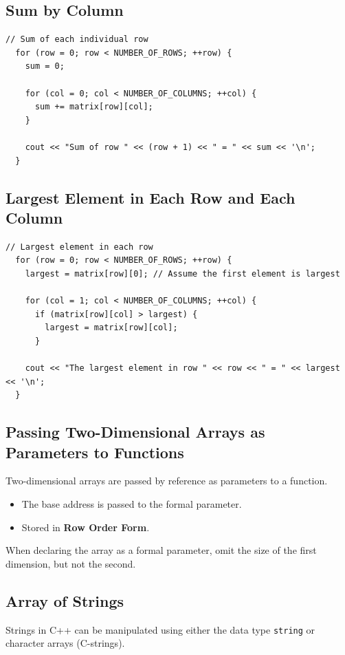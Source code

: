 \documentclass{article}
\begin{document}
\subsection{Sum by Column}
\begin{lstlisting}[caption={Find Sum of Individual Columns}]
  // Sum of each individual row 
  for (row = 0; row < NUMBER_OF_ROWS; ++row) {
    sum = 0;

    for (col = 0; col < NUMBER_OF_COLUMNS; ++col) {
      sum += matrix[row][col];
    }

    cout << "Sum of row " << (row + 1) << " = " << sum << '\n';
  }
\end{lstlisting}

\subsection{Largest Element in Each Row and Each Column}
\begin{lstlisting}[caption={Algorithm To Find Largest Element in Each Row}]
  // Largest element in each row 
  for (row = 0; row < NUMBER_OF_ROWS; ++row) {
    largest = matrix[row][0]; // Assume the first element is largest

    for (col = 1; col < NUMBER_OF_COLUMNS; ++col) {
      if (matrix[row][col] > largest) {
        largest = matrix[row][col];
      }

    cout << "The largest element in row " << row << " = " << largest << '\n';
  }
\end{lstlisting}

\subsection{Passing Two-Dimensional Arrays as Parameters to Functions}
Two-dimensional arrays are passed by reference as parameters to a function.
\begin{itemize}
  \item The base address is passed to the formal parameter.
  \item Stored in \textbf{Row Order Form}.
\end{itemize}

When declaring the array as a formal parameter, omit the size of the first
dimension, but not the second.

\subsection{Array of Strings}
Strings in C++ can be manipulated using either the data type \texttt{string} or
character arrays (C-strings).
\end{document}
